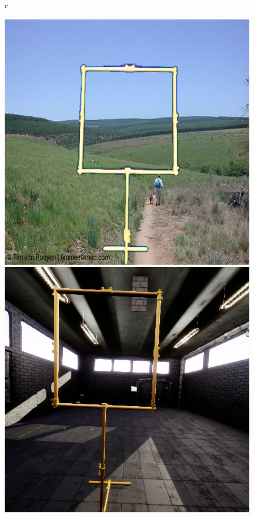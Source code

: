 \begin{figure}c
	\centering
	\begin{minipage}{0.3\textwidth}
		\includegraphics[width=\textwidth]{fig/voc}
	\end{minipage}
	\begin{minipage}{0.3\textwidth}
		\includegraphics[width=\textwidth]{fig/sim}

\end{minipage}
\end{figure}

